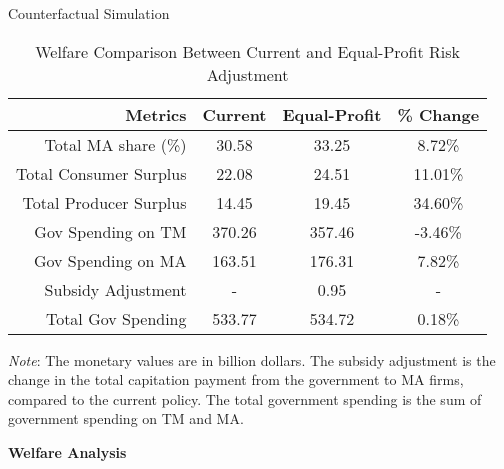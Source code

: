 \documentclass{beamer}
\begin{document}
\begin{frame}[t]
\begin{columns}[t]
\begin{column}{.25 \textwidth}
\begin{block}{Counterfactual Simulation}
        \begin{table}[ht]
          \small
          \centering
          \caption{Welfare Comparison Between Current and Equal-Profit Risk Adjustment}
          \label{tab:counterfactual}
          \begin{threeparttable}
            \renewcommand{\arraystretch}{1.2}
            \begin{tabular}{@{}rccc@{}}
              \toprule
              \textbf{Metrics} & \textbf{Current} & \textbf{Equal-Profit} & \textbf{\% Change} \\ \midrule
              Total MA share (\%) & 30.58 & 33.25 & 8.72\% \\
              Total Consumer Surplus & 22.08 & 24.51 & 11.01\% \\
              Total Producer Surplus & 14.45 & 19.45 & 34.60\% \\
              Gov Spending on TM & 370.26 & 357.46 & -3.46\% \\
              Gov Spending on MA & 163.51 & 176.31 & 7.82\% \\
              Subsidy Adjustment & - & 0.95 & - \\
              Total Gov Spending & 533.77 & 534.72 & 0.18\% \\
              \bottomrule
            \end{tabular}
            \begin{tablenotes}
              \footnotesize
              \textit{Note}: The monetary values are in billion dollars. The subsidy adjustment is the change in the total capitation payment from the government to MA firms, compared to the current policy. The total government spending is the sum of government spending on TM and MA.
            \end{tablenotes}
          \end{threeparttable}

        \end{table}
        \begin{center}
          \textbf{Welfare Analysis}
        \end{center}
        

\end{block}
\end{column}
\end{columns}
\end{frame}
\end{document}
